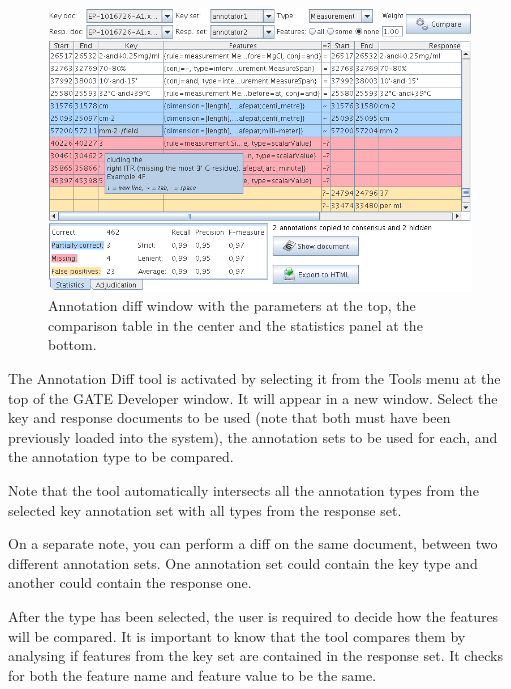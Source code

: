 
\begin{figure}[htbp]
\begin{center}
\includegraphics[width=14cm]{annotation-diff-statistics.png}
\end{center}
\caption{Annotation diff window with the parameters at the top,
the comparison table in the center and the statistics panel at the
bottom.}
\label{fig:annotdiff}
\end{figure}

The Annotation Diff tool is activated by selecting it from the Tools menu
at the top of the GATE Developer window. It will appear in a new
window.  Select the key and response documents to be used (note that
both must have been previously loaded into the system), the annotation
sets to be used for each, and the annotation type to be compared.

Note that the tool automatically intersects all the annotation
types from the selected key annotation set with all types from the
response set.

On a separate note, you can perform a diff on the same document,
between two different annotation sets. One annotation set could
contain the key type and another could contain the response one.

After the type has been selected, the user is required to decide
how the features will be compared. It is important to know that
the tool compares them by analysing if features from the key set
are contained in the response set. It checks for both the feature
name and feature value to be the same.


